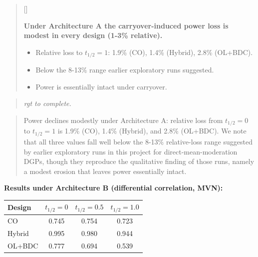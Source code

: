 \documentclass[
  11pt,
]{article}
\newcounter{pgraph}
\newenvironment{bullets}{%
  \stepcounter{pgraph}%
  \begin{quote}\small\sffamily\color[gray]{0.30}%
  {\normalfont\scriptsize\color[gray]{0.58}[\thepgraph]\enspace}}{%
  \end{quote}}
\newenvironment{rgt}{%
  \begin{quote}\small\itshape\color[RGB]{20,60,160}}{%
  \end{quote}}
\newenvironment{orig}{%
  \begin{quote}\normalsize\color[gray]{0.55}}{%
  \end{quote}}
\begin{document}
\begin{bullets}

\textbf{Under Architecture A the carryover-induced power loss is
modest in every design (1-3\% relative).}

\begin{itemize}\setlength{\itemsep}{2pt}\setlength{\parskip}{0pt}
\item Relative loss to $t_{1/2} = 1$: 1.9\% (CO), 1.4\% (Hybrid),
2.8\% (OL+BDC).
\item Below the 8-13\% range earlier exploratory runs suggested.
\item Power is essentially intact under carryover.
\end{itemize}

\end{bullets}

\begin{rgt}
rgt to complete.

\end{rgt}

\begin{orig}
Power declines modestly under Architecture A: relative loss from
\(t_{1/2} = 0\) to \(t_{1/2} = 1\) is 1.9\% (CO), 1.4\% (Hybrid), and
2.8\% (OL+BDC). We note that all three values fall well below the 8-13\%
relative-loss range suggested by earlier exploratory runs in this
project for direct-mean-moderation DGPs, though they reproduce the
qualitative finding of those runs, namely a modest erosion that leaves
power essentially intact.

\end{orig}

\textbf{Results under Architecture B (differential correlation,
MVN):}

\begin{table}[htbp]
\centering
\begin{tabular}{lccc}
\toprule
Design & $t_{1/2} = 0$ & $t_{1/2} = 0.5$ & $t_{1/2} = 1.0$ \\
\midrule
CO & 0.745 & 0.754 & 0.723 \\
Hybrid & 0.995 & 0.980 & 0.944 \\
OL+BDC & 0.777 & 0.694 & 0.539 \\
\bottomrule
\end{tabular}
\end{table}
\end{document}
